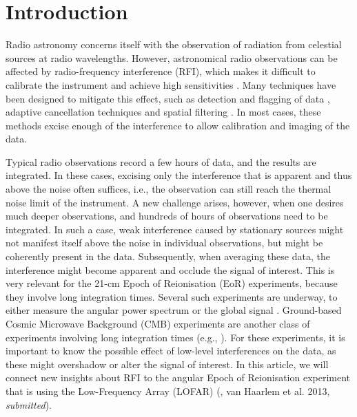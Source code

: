 \documentclass[useAMS,usenatbib]{mn2e}
\begin{document}
\section{Introduction}
Radio astronomy concerns itself with the observation of radiation from celestial sources at radio wavelengths. However, astronomical radio observations can be affected by radio-frequency interference (RFI), which makes it difficult to calibrate the instrument and achieve high sensitivities \citep{impact-of-warc79,interference-and-radioastronomy-1991,interference-model-lemmon,rfi-mitigation-overview-fridman-baan}. Many techniques have been designed to mitigate this effect, such as detection and flagging of data \citep{chi-square-time-blanking-weber, multichannel-rfi-mitigation, exoplanet-detection-with-rfi, wsrt-rfims, pulse-blanking, effelsberg-rfi-mitigation, LOFAR-RFI-pipeline}, adaptive cancellation techniques \citep{adaptive-cancellation,post-correlation-reference-signal} and spatial filtering \citep{multichannel-rfi-mitigation, ellingson-spatial-nulling-2002, hampson-spatial-nulling-2002, boonstra-dissertation, spatial-filtering-parkes-multibeam-for-pulses, post-correlation-filtering}. In most cases, these methods excise enough of the interference to allow calibration and imaging of the data.

Typical radio observations record a few hours of data, and the results are integrated. In these cases, excising only the interference that is apparent and thus above the noise often suffices, i.e., the observation can still reach the thermal noise limit of the instrument. A new challenge arises, however, when one desires much deeper observations, and hundreds of hours of observations need to be integrated. In such a case, weak interference caused by stationary sources might not manifest itself above the noise in individual observations, but might be coherently present in the data. Subsequently, when averaging these data, the interference might become apparent and occlude the signal of interest. This is very relevant for the 21-cm Epoch of Reionisation (EoR) experiments, because they involve long integration times. Several such experiments are underway, to either measure the angular power spectrum \citep{gmrt-eor-2011-paciga,de-bruyn-eor-ursi-2011,eor-paper-2011-jacobs,eor-mwa-2012-williams} or the global signal \citep{edges}. Ground-based Cosmic Microwave Background (CMB) experiments are another class of experiments involving long integration times (e.g., \citealt{ska-cmb-subrahmanyan}). For these experiments, it is important to know the possible effect of low-level interferences on the data, as these might overshadow or alter the signal of interest. In this article, we will connect new insights about RFI to the angular Epoch of Reionisation experiment that is using the Low-Frequency Array (LOFAR) (\citealt{de-bruyn-eor-ursi-2011}, van Haarlem et al. 2013, \textit{submitted}).
\end{document}
